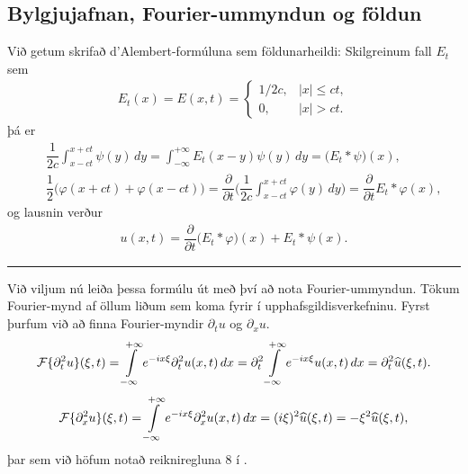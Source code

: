 \documentclass[a4paper,10pt,icelandic]{sphinxmanual}
\begin{document}
\begin{DUlineblock}{0em}
\item[] 
\item[] 
\end{DUlineblock}


\subsection{Bylgjujafnan, Fourier-ummyndun og földun}
\label{\detokenize{Kafli04:bylgjujafnan-fourier-ummyndun-og-foldun}}
Við getum skrifað d’Alembert-formúluna sem földunarheildi: Skilgreinum fall \(E_t\) sem
\begin{equation*}
\begin{split}E_t(x)=E(x,t)= \begin{cases} 1/2c, &|x|\leq ct,\\ 0,
&|x|>ct.\end{cases}\end{split}
\end{equation*}
þá er
\begin{equation*}
\begin{split}&& \dfrac 1{2c}\int_{x-ct}^{x+ct}\psi(y)\, dy
=\int_{-\infty}^{+\infty}E_t(x-y)\psi(y)\, dy = \big(E_t\ast \psi\big)(x),
\\
&& \dfrac 12\big(\varphi(x+ct)+\varphi(x-ct)\big)
=\dfrac{\partial}{\partial t}\bigg(
\dfrac 1{2c}\int_{x-ct}^{x+ct}\varphi(y)\, dy
\bigg) =\dfrac{\partial}{\partial t} E_t\ast \varphi(x),\end{split}
\end{equation*}
og lausnin verður
\begin{equation*}
\begin{split}u(x,t)=\dfrac{\partial}{\partial t}\big( E_t\ast \varphi\big)(x)+
E_t\ast \psi(x).\end{split}
\end{equation*}

\bigskip\hrule\bigskip


Við viljum nú leiða þessa formúlu út með því að nota Fourier-ummyndun. Tökum Fourier-mynd af öllum liðum sem koma fyrir í upphafsgildisverkefninu. Fyrst þurfum við að finna Fourier-myndir \(\partial_t u\) og \(\partial_x u\).
\begin{equation*}
\begin{split}{{\cal F}}\{\partial_t^2 u\}(\xi,t)
=\int\limits_{-\infty}^{+\infty}e^{-ix\xi}\partial_t^2 u(x,t)\, dx
=\partial_t^2\int\limits_{-\infty}^{+\infty}e^{-ix\xi}u(x,t)\, dx
=\partial_t^2\widehat u(\xi,t).\end{split}
\end{equation*}\begin{equation*}
\begin{split}{{\cal F}}\{{\partial}_x^2u\}({\xi},t)
=\int\limits_{-\infty}^{+\infty}e^{-ix\xi}\partial_x^2u(x,t)\, dx
=(i{\xi})^2\widehat u({\xi},t)=-{\xi}^2\widehat u({\xi},t),\end{split}
\end{equation*}
þar sem við höfum notað reikniregluna 8 í {\hyperref[\detokenize{Kafli04:rulesft}]{}}.
\end{document}

